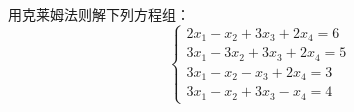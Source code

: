 \begin{example}
    
\end{example}



\begin{solution}
    
\end{solution}

\begin{example}
    
\end{example}



\begin{solution}
    
\end{solution}















\begin{ex}
    用克莱姆法则解下列方程组：
\[\begin{cases}
    2x_1-x_2+3x_3+2x_4=6\\
    3x_1-3x_2+3x_3+2x_4=5\\
    3x_1-x_2-x_3+2x_4=3\\
    3x_1-x_2+3x_3-x_4=4
\end{cases}  \]
\end{ex}

